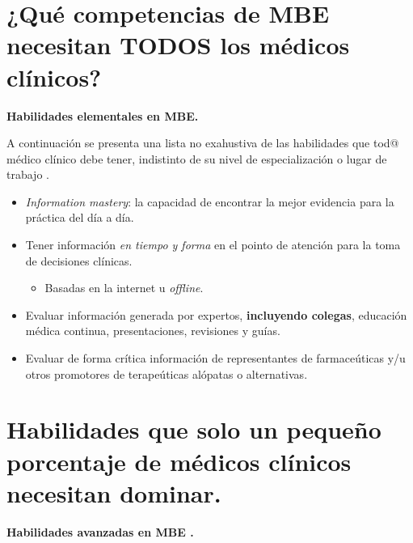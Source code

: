 \documentclass[]{book}
\providecommand{\tightlist}{%
  \setlength{\itemsep}{0pt}\setlength{\parskip}{0pt}}
\begin{document}
\hypertarget{que-competencias-de-mbe-necesitan-todos-los-medicos-clinicos}{%
\section{¿Qué competencias de MBE necesitan TODOS los médicos clínicos?}\label{que-competencias-de-mbe-necesitan-todos-los-medicos-clinicos}}

\textbf{Habilidades elementales en MBE.}

A continuación se presenta una lista no exahustiva de las habilidades que tod@ médico clínico debe tener, indistinto de su nivel de especialización o lugar de trabajo \citep{slawson2005teaching}.

\begin{itemize}
\tightlist
\item
  \emph{Information mastery}: la capacidad de encontrar la mejor evidencia para la práctica del día a día.
\item
  Tener información \emph{en tiempo y forma} en el pointo de atención para la toma de decisiones clínicas.

  \begin{itemize}
  \tightlist
  \item
    Basadas en la internet u \emph{offline}.
  \end{itemize}
\item
  Evaluar información generada por expertos, \textbf{incluyendo colegas}, educación médica continua, presentaciones, revisiones y guías.
\item
  Evaluar de forma crítica información de representantes de farmaceúticas y/u otros promotores de terapeúticas alópatas o alternativas.
\end{itemize}

\hypertarget{habilidades-que-solo-un-pequeno-porcentaje-de-medicos-clinicos-necesitan-dominar.}{%
\section{Habilidades que solo un pequeño porcentaje de médicos clínicos necesitan dominar.}\label{habilidades-que-solo-un-pequeno-porcentaje-de-medicos-clinicos-necesitan-dominar.}}

\textbf{Habilidades avanzadas en MBE \citep{slawson2005teaching}.}
\end{document}

